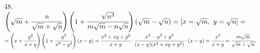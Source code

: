 48. $\left(\sqrt{m}+\cfrac{n}{\sqrt{m}+\sqrt{n}}\right)\left(1+\cfrac{\sqrt{n^3}}{m\sqrt{m}-n\sqrt{n}}\right)(
\sqrt{m}-\sqrt{n})=[x=\sqrt{m},\ y=\sqrt{n}]=$\\$=\left(x+\cfrac{y^2}{x+y}\right)\left(1+\cfrac{y^3}{x^3-y^3}\right)(
x-y)=\cfrac{x^2+xy+y^2}{x+y}\cdot\cfrac{x^3-y^3+y^3}{(x-y)(x^2+xy+y^2)}\cdot(x-y)=\cfrac{x^3}{x+y}=\cfrac{m\sqrt{m}}{\sqrt{m}+\sqrt{n}}.$\\
